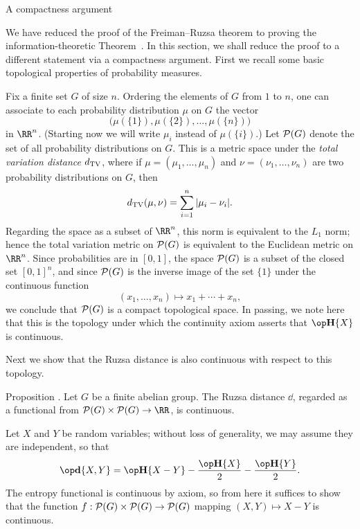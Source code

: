 \edef\sectcompactness{\the\sectcount}
\advsect A compactness argument

We have reduced the proof of the Freiman--Ruzsa theorem to proving the inform\-ation-theoretic
Theorem~{\thmsubgroup}. In this section, we shall reduce the proof to a different statement via a compactness
argument. First we recall some basic topological properties of probability measures.

Fix a finite set $G$ of size $n$. Ordering the elements of $G$ from $1$ to $n$, one can associate
to each probability distribution $\mu$ on $G$ the vector
$$\bigl( \mu(\{1\}), \mu(\{2\}), \ldots, \mu(\{n\})\bigr)$$
in $\RR^n$. (Starting now we will write $\mu_i$ instead of $\mu(\{i\})$.)
Let $\P(G)$ denote the set of all probability distributions on $G$.
This is a metric space under the {\it total variation
distance} $\dTV$, where if $\mu = (\mu_1,\ldots,\mu_n)$
and $\nu = (\nu_1,\ldots,\nu_n)$ are two probability distributions on $G$, then
$$\dTV(\mu,\nu) = \sum_{i=1}^n |\mu_i - \nu_i|.$$
Regarding the space as a subset of $\RR^n$, this norm is equivalent to the $L_1$ norm; hence
the total variation metric on $\P(G)$ is equivalent to the Euclidean metric on $\RR^n$.
Since probabilities are in $[0,1]$, the space $\P(G)$ is a subset of the closed set $[0,1]^n$,
and since $\P(G)$ is the inverse image of the set $\{1\}$ under the continuous function
$$(x_1,\ldots,x_n) \mapsto x_1 + \cdots + x_n,$$
we conclude that $\P(G)$ is a compact topological space. In passing, we note here that this is
the topology under which the continuity axiom asserts that $\Eta\{X\}$ is continuous.

Next we show that the Ruzsa distance is also continuous with respect to this topology.

\edef\propruzsacontinuous{\the\sectcount.\the\thmcount}
\proclaim Proposition \advthm. Let $G$ be a finite abelian group.
The Ruzsa distance $\dd$, regarded as a functional
from $\P(G)\times \P(G)\to \RR$, is continuous.

Let $X$ and $Y$ be random variables; without loss of generality, we may assume they are independent,
so that
$$\dd\{X,Y\} = \Eta\{X-Y\} - {\Eta\{X\} \over 2} - {\Eta\{Y\}\over 2}.$$
The entropy functional is continuous by axiom, so from here it suffices to show that
the function $f : \P(G)\times \P(G) \to \P(G)$ mapping $(X,Y)\mapsto X-Y$ is continuous.

